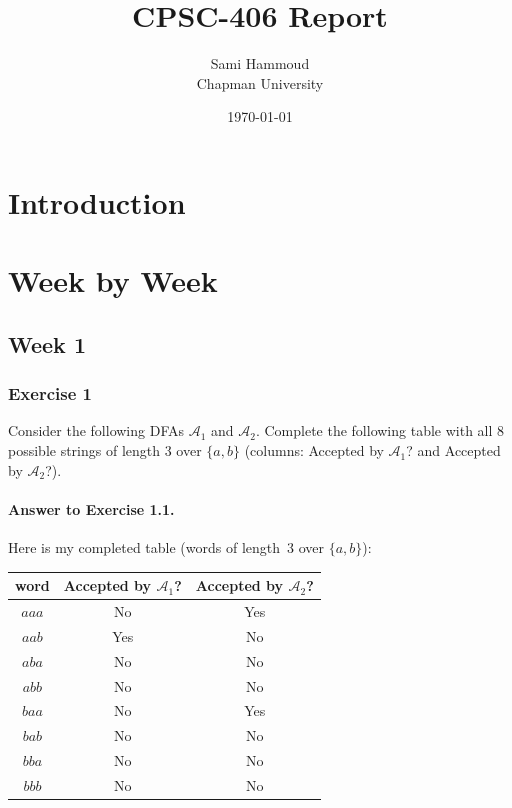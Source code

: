 \documentclass{article}
\title{CPSC-406 Report}
\author{Sami Hammoud  \\ Chapman University}
\date{\today}
\theoremstyle{theorem}
\theoremstyle{definition}
\theoremstyle{remark}
\begin{document}
\maketitle

\begin{abstract}
\end{abstract}

\setcounter{tocdepth}{3}
\tableofcontents

\section{Introduction}\label{intro}

\section{Week by Week}\label{homework}

\subsection{Week 1}

\subsubsection*{Exercise 1}
Consider the following DFAs $\mathcal{A}_1$ and $\mathcal{A}_2$. Complete the following table with all 8 possible strings of length 3 over $\{a,b\}$ (columns: Accepted by $\mathcal{A}_1$? and Accepted by $\mathcal{A}_2$?).

\paragraph{Answer to Exercise 1.1.}
Here is my completed table (words of length~3 over $\{a,b\}$):

\begin{center}
\begin{tabular}{|c|c|c|}
  \hline
  word & Accepted by $\mathcal{A}_1$? & Accepted by $\mathcal{A}_2$? \\
  \hline
  $aaa$ & No  & Yes \\
  $aab$ & Yes & No  \\
  $aba$ & No  & No  \\
  $abb$ & No  & No  \\
  $baa$ & No  & Yes \\
  $bab$ & No  & No  \\
  $bba$ & No  & No  \\
  $bbb$ & No  & No  \\
  \hline
\end{tabular}
\end{center}
\end{document}
